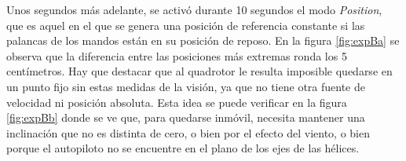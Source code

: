 Unos segundos más adelante, se activó durante 10 segundos el modo \textit{Position}, que es aquel en el que se genera una posición de referencia constante si las palancas de los mandos están en su posición de reposo. En la figura \ref{fig:expBa} se observa que la diferencia entre las posiciones más extremas ronda los 5 centímetros. Hay que destacar que al quadrotor le resulta imposible quedarse en un punto fijo sin estas medidas de la visión, ya que no tiene otra fuente de velocidad ni posición absoluta. Esta idea se puede verificar en la figura \ref{fig:expBb} donde se ve que, para quedarse inmóvil, necesita mantener una inclinación que no es distinta de cero, o bien por el efecto del viento, o bien porque el autopiloto no se encuentre en el plano de los ejes de las hélices. 


\figExpA
\figExpB
\figVuelo

\endinput
